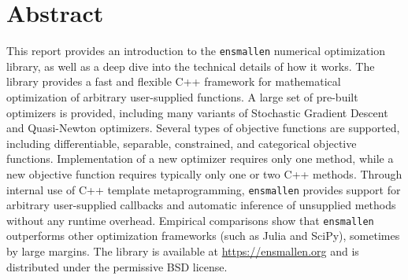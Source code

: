 \section*{Abstract}

This report provides an introduction to the {\tt ensmallen} numerical optimization library,
as well as a deep dive into the technical details of how it works.
The library provides a fast and flexible C++ framework
for mathematical optimization of arbitrary user-supplied functions.
A large set of pre-built optimizers is provided,
including many variants of Stochastic Gradient Descent and Quasi-Newton optimizers.
Several types of objective functions are supported, including differentiable,
separable, constrained, and categorical objective functions.
Implementation of a new optimizer requires only one method,
while a new objective function requires typically only one or two C++ methods.
Through internal use of C++ template metaprogramming, {\tt ensmallen} provides support for arbitrary
user-supplied callbacks and automatic inference of unsupplied methods without
any runtime overhead.
Empirical comparisons show that {\tt ensmallen}
outperforms other optimization frameworks (such as Julia and SciPy), sometimes
by large margins.  The library is available at \url{https://ensmallen.org}
and is distributed under the permissive BSD license.



